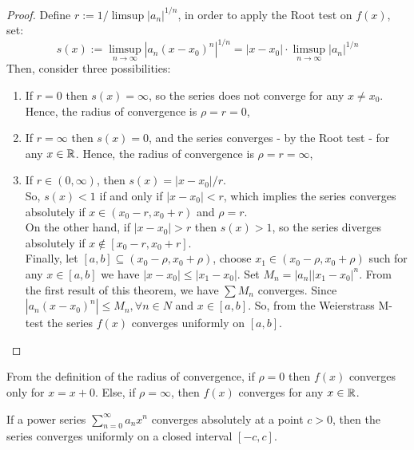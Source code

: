\begin{proof}
    Define $r := 1/\limsup |a_n|^{1/n}$, in order to apply the Root test on $f(x)$, set:
    \begin{equation*}
       s(x) := \limsup \limits_{n \to \infty} |a_n(x - x_0)^n|^{1/n} = |x-x_0| \cdot \limsup \limits_{n \to \infty} |a_n|^{1/n}
    \end{equation*}
    Then, consider three possibilities:
    \begin{enumerate}
        \item If $r = 0$ then $s(x) = \infty$, so the series does not converge for any $ x \neq x_0$. Hence, the radius of convergence is $\rho = r = 0$,
        \item If $r = \infty$ then $s(x) = 0$, and the series converges - by the Root test - for any $x \in \mathbb{R}$. Hence, the radius of convergence is $\rho = r = \infty$,
        \item If $r \in (0, \infty)$, then $s(x) = |x-x_0|/r$. \\
        So, $s(x) < 1$ if and only if $|x - x_0| < r$, which implies the series converges absolutely if $x \in (x_0 - r, x_0 + r)$ and $\rho = r$. \\ 
        On the other hand, if $|x-x_0| > r$ then $s(x) > 1$, so the series diverges absolutely if $x \not \in [x_0 - r, x_0 + r]$.\\ 
        Finally, let $[a,b] \subseteq (x_0 - \rho, x_0 + \rho)$, choose $x_1 \in (x_0 - \rho, x_0 + \rho)$ such for any $x \in [a,b]$ we have $|x - x_0| \leq |x_1 - x_0|$. Set $M_n = |a_n||x_1 - x_0|^n$. From the first result of this theorem, we have $\sum M_n$ converges. Since $|a_n(x - x_0)^n| \leq M_n, \forall n \in N$ and $x \in [a,b]$. So, from the Weierstrass M-test the series $f(x)$ converges uniformly on $[a,b]$.
    \end{enumerate}
\end{proof}

From the definition of the radius of convergence, if $\rho = 0$ then $f(x)$ converges only for $x = x+0$. Else, if $\rho = \infty$, then $f(x)$ converges for any $x \in \mathbb{R}$.

\begin{theorem}
    If a power series $\sum_{n=0}^\infty a_n x^n$ converges absolutely at a point $c > 0$, then the series converges uniformly on a closed interval $[-c, c]$.
\end{theorem}

